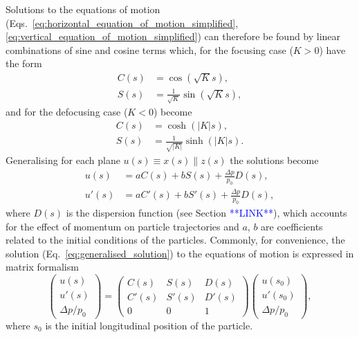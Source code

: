 \documentclass[../main.tex]{subfiles}
\begin{document}
Solutions to the equations of motion (Eqs.~\ref{eq:horizontal_equation_of_motion_simplified}, \ref{eq:vertical_equation_of_motion_simplified}) can therefore be found by linear combinations of sine and cosine terms which, for the focusing case ($K>0$) have the form
\begin{align}
C\left(s\right) &= \cos\left(\sqrt{K}s\right), \nonumber\\
S\left(s\right) &= \frac{1}{\sqrt{K}}\sin\left(\sqrt{K}s\right),
\label{eq:focusing_solution_equation_of_motion}
\end{align}
and for the defocusing case ($K<0$) become
\begin{align}
C\left(s\right) &= \cosh\left(\left|K\right|s\right), \nonumber \\
S\left(s\right) &= \frac{1}{\sqrt{\left|K\right|}}\sinh\left(\left|K\right|s\right).
\label{eq:defocusing_solution_equation_of_motion}    
\end{align}
Generalising for each plane $u\left(s\right)\equiv x\left(s\right) \parallel z\left(s\right)$ the solutions become
\begin{align}
u\left(s\right) &= aC\left(s\right) + bS\left(s\right) + \frac{\Delta p}{p_{0}}D\left(s\right), \nonumber \\
u'\left(s\right) &= aC'\left(s\right) + bS'\left(s\right) + \frac{\Delta p}{p_{0}}D\left(s\right),
\label{eq:generalised_solution}
\end{align}
where $D\left(s\right)$ is the dispersion function (see Section \textcolor{blue}{**LINK**}), which accounts for the effect of momentum on particle trajectories and $a$, $b$ are coefficients related to the initial conditions of the particles. Commonly, for convenience, the solution (Eq.~\ref{eq:generalised_solution}) to the equations of motion is expressed in matrix formalism
\begin{equation}
\begin{pmatrix}
u\left(s\right) \\
u'\left(s\right) \\
\Delta p/p_{0}
\end{pmatrix} = 
\begin{pmatrix}
C\left(s\right) & S\left(s\right) & D\left(s\right) \\
C'\left(s\right) & S'\left(s\right) & D'\left(s\right) \\
0 & 0 & 1
\end{pmatrix}
\begin{pmatrix}
u\left(s_{0}\right) \\
u'\left(s_{0}\right) \\
\Delta p/p_{0}
\end{pmatrix},
\label{eq:general_solution_matrix}    
\end{equation}
where $s_{0}$ is the initial longitudinal position of the particle.
\end{document}
